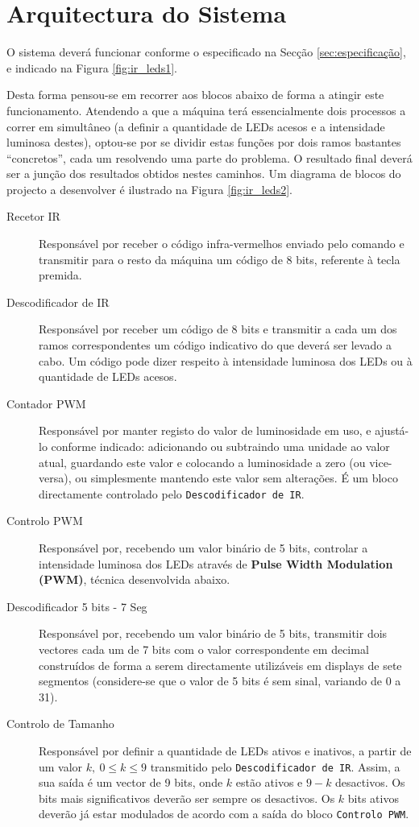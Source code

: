 \documentclass[a4paper,11pt,openright,oneside]{report}
\begin{document}
\section{Arquitectura do Sistema}


O sistema deverá funcionar conforme o especificado na Secção \ref{sec:especificação}, e indicado na Figura \ref{fig:ir_leds1}.

Desta forma pensou-se em recorrer aos blocos abaixo de forma a atingir este funcionamento. Atendendo a que a máquina terá essencialmente dois processos a correr em simultâneo (a definir a quantidade de LEDs acesos e a intensidade luminosa destes), optou-se por se dividir estas funções por dois ramos bastantes ``concretos'', cada um resolvendo uma parte do problema. O resultado final deverá ser a junção  dos resultados obtidos nestes caminhos. Um diagrama de blocos do projecto a desenvolver é ilustrado na Figura \ref{fig:ir_leds2}.

\begin{description}
\item[Recetor IR] Responsável por receber o código infra-vermelhos enviado pelo comando e transmitir para o resto da máquina um código de 8 bits, referente à tecla premida.
\item[Descodificador de IR] Responsável por receber um código de 8 bits e transmitir a cada um dos ramos correspondentes um código indicativo do que deverá ser levado a cabo. Um código pode dizer respeito à intensidade luminosa dos LEDs ou à quantidade de LEDs acesos.
\item[Contador PWM] Responsável por manter registo do valor de luminosidade em uso, e ajustá-lo conforme indicado: adicionando ou subtraindo uma unidade ao valor atual, guardando este valor e colocando a luminosidade a zero (ou vice-versa), ou simplesmente mantendo este valor sem alterações. É um bloco directamente controlado pelo \verb|Descodificador de IR|.
\item[Controlo PWM] Responsável por, recebendo um valor binário de 5 bits, controlar a intensidade luminosa dos LEDs através de \textbf{Pulse Width Modulation (PWM)}, técnica desenvolvida abaixo.
\item[Descodificador 5 bits - 7 Seg] Responsável por, recebendo um valor binário de 5 bits, transmitir dois vectores cada um de 7 bits com o valor correspondente em decimal construídos de forma a serem directamente utilizáveis em displays de sete segmentos (considere-se que o valor de 5 bits é sem sinal, variando de 0 a 31).
\item[Controlo de Tamanho] Responsável por definir a quantidade de LEDs ativos e inativos, a partir de um valor $k,\ 0 \leq k \leq 9$ transmitido pelo \verb|Descodificador de IR|. Assim, a sua saída é um vector de 9 bits, onde $k$ estão ativos e $9 - k$ desactivos. Os bits mais significativos deverão ser sempre os desactivos. Os $k$ bits ativos deverão já estar modulados de acordo com a saída do bloco \verb|Controlo PWM|. 
\end{description}
\end{document}
